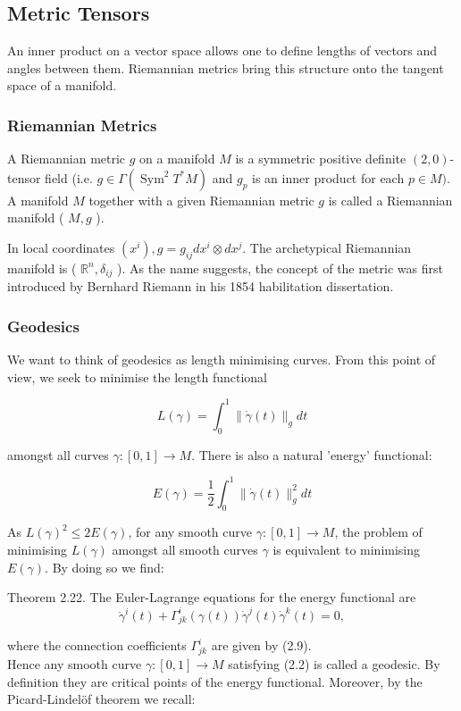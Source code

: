 \documentclass[10pt, letterpaper]{article}
\begin{document}
\subsection*{Metric Tensors}

An inner product on a vector space allows one to define lengths of vectors and angles between them. Riemannian metrics bring this structure onto the tangent space of a manifold.

\subsubsection*{Riemannian Metrics}
A Riemannian metric $g$ on a manifold $M$ is a symmetric positive definite $(2,0)$-tensor field (i.e. $g \in \Gamma\left(\operatorname{Sym}^{2} T^{*} M\right)$ and $g_{p}$ is an inner product for each $p \in M)$. A manifold $M$ together with a given Riemannian metric $g$ is called a Riemannian manifold ( $M, g$ ).

In local coordinates $\left(x^{i}\right), g=g_{i j} d x^{i} \otimes d x^{j}$. The archetypical Riemannian manifold is ( $\mathbb{R}^{n}, \delta_{i j}$ ). As the name suggests, the concept of the metric was first introduced by Bernhard Riemann in his 1854 habilitation dissertation.

\subsubsection*{Geodesics}
We want to think of geodesics as length minimising curves. From this point of view, we seek to minimise the length functional

$$
L(\gamma)=\int_{0}^{1}\|\dot{\gamma}(t)\|_{g} d t
$$

amongst all curves $\gamma:[0,1] \rightarrow M$. There is also a natural 'energy' functional:

$$
E(\gamma)=\frac{1}{2} \int_{0}^{1}\|\dot{\gamma}(t)\|_{g}^{2} d t
$$

As $L(\gamma)^{2} \leq 2 E(\gamma)$, for any smooth curve $\gamma:[0,1] \rightarrow M$, the problem of minimising $L(\gamma)$ amongst all smooth curves $\gamma$ is equivalent to minimising $E(\gamma)$. By doing so we find:



Theorem 2.22. The Euler-Lagrange equations for the energy functional are
$$
\ddot{\gamma}^{i}(t)+\Gamma_{j k}^{i}(\gamma(t)) \dot{\gamma}^{j}(t) \dot{\gamma}^{k}(t)=0,
$$

where the connection coefficients $\Gamma_{j k}^{i}$ are given by (2.9).\\
Hence any smooth curve $\gamma:[0,1] \rightarrow M$ satisfying (2.2) is called a geodesic. By definition they are critical points of the energy functional. Moreover, by the Picard-Lindelöf theorem we recall:
\end{document}
